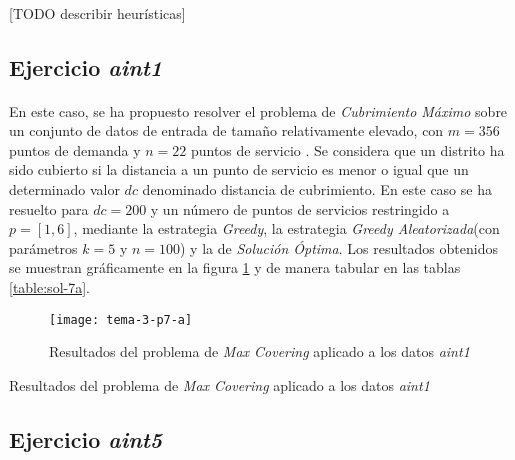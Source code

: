 \documentclass[spanish]{article}
\begin{document}
		\paragraph{}
		[TODO describir heurísticas]


		\subsection{Ejercicio \emph{aint1}}
		\label{sec:e-7a}

			\paragraph{}
			En este caso, se ha propuesto resolver el problema de \emph{Cubrimiento Máximo} sobre un conjunto de datos de entrada de tamaño relativamente elevado, con $m = 356$ puntos de demanda y $n=22$ puntos de servicio . Se considera que un distrito ha sido cubierto si la distancia a un punto de servicio es menor o igual que un determinado valor $dc$ denominado distancia de cubrimiento. En este caso se ha resuelto para $dc = 200$ y un número de puntos de servicios restringido a $p = [1,6]$, mediante la estrategia \emph{Greedy}, la estrategia \emph{Greedy Aleatorizada}(con parámetros $k=5$ y $n=100$) y la de \emph{Solución Óptima}. Los resultados obtenidos se muestran gráficamente en la figura \ref{fig:sol-7a} y de manera tabular en las tablas \ref{table:sol-7a}.

			\begin{figure}[h]
				\begin{center}
					\texttt{[image: tema-3-p7-a]}
				\end{center}
				\caption{Resultados del problema de \emph{Max Covering} aplicado a los datos \emph{aint1}}
				\label{fig:sol-7a}
			\end{figure}

			\begin{table}[h]
				\begin{center}
				\end{center}
				\caption{Resultados del problema de \emph{Max Covering} aplicado a los datos \emph{aint1}}
				\label{table:sol-7a}
			\end{table}

		\subsection{Ejercicio \emph{aint5}}
		\label{sec:e-7b}
\end{document}
